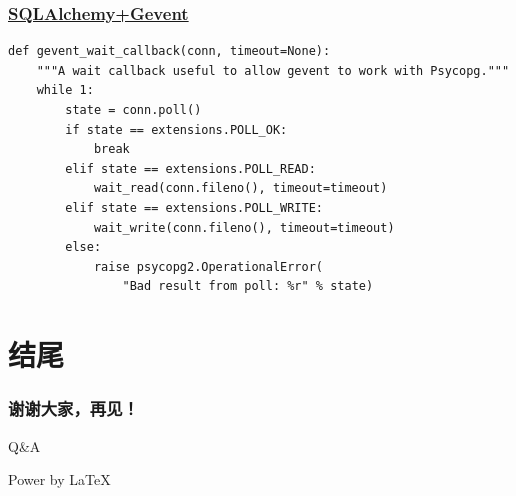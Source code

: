\documentclass{beamer}
\begin{document}
\begin{frame}[containsverbatim]
  \frametitle{\href{https://bitbucket.org/zzzeek/green_sqla/src/2732bb7ea9d06b9d4a61e8cd587a95148ce2599b/green_sqla/psyco_gevent.py?at=default}{SQLAlchemy+Gevent}}
  \begin{lstlisting}
def gevent_wait_callback(conn, timeout=None):
    """A wait callback useful to allow gevent to work with Psycopg."""
    while 1:
        state = conn.poll()
        if state == extensions.POLL_OK:
            break
        elif state == extensions.POLL_READ:
            wait_read(conn.fileno(), timeout=timeout)
        elif state == extensions.POLL_WRITE:
            wait_write(conn.fileno(), timeout=timeout)
        else:
            raise psycopg2.OperationalError(
                "Bad result from poll: %r" % state)
  \end{lstlisting}
\end{frame}

\section{结尾}
\begin{frame}
  \frametitle{谢谢大家，再见！}
  \begin{center}
    \Huge{Q\&A}
  \end{center}
  \begin{flushright}
    Power by \LaTeX{}
  \end{flushright}

\end{frame}
\end{document}
